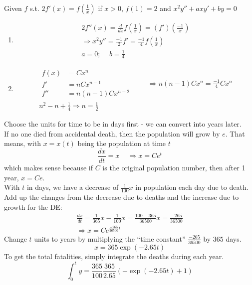 \documentclass[twoside]{amsart}
\theoremstyle{plain}
\theoremstyle{definition}
\newcommand{\exercisehead}[1]
  {\smallskip
   \noindent{\small\bf Exercise #1.}}
\begin{document}
\exercisehead{24} Given $f$ s.t. $2f'(x) = f\left( \frac{1}{x} \right)$ if $x >0$, $f(1) = 2$ and $x^2 y'' + axy' + by = 0$ \\
\begin{enumerate}
\item 
\[
\begin{gathered}
2f''(x) = \frac{d}{dx} f\left( \frac{1}{x} \right) = (f')\left( \frac{-1}{x} \right) \\
\Longrightarrow x^2 y'' = \frac{-1}{2} f' = \frac{-1}{4} f\left( \frac{1}{x} \right) \\
\boxed{ a = 0; \quad \, b = \frac{1}{4} }
\end{gathered}
\]
\item  \[
\begin{gathered}
  \begin{aligned}
    f(x) & = Cx^n \\
    f' & = n C x^{n-1} \\
    f'' & = n(n-1) Cx^{n-2} 
  \end{aligned} \quad \quad \, \Longrightarrow n(n-1)Cx^n = \frac{-1}{4} Cx^n \\
  n^2 - n + \frac{1}{4} \Longrightarrow \boxed{ n = \frac{1}{2} } 
\end{gathered}
\] 
\end{enumerate}

\exercisehead{28} Choose the units for time to be in days first - we can convert into years later.  \medskip \\
If no one died from accidental death, then the population will grow by $e$.  That means, with $x=x(t)$ being the population at time $t$ 
\[
\frac{dx}{dt} = x \quad \, \Longrightarrow x = Ce^t
\]
which makes sense because if $C$ is the original population number, then after 1 year, $x=Ce$.   \\

With $t$ in days, we have a decrease of $\frac{1}{100} x$ in population each day due to death.  Add up the changes from the decrease due to deaths and the increase due to growth for the DE:
\[
\begin{gathered}
\frac{dx}{dt} = \frac{1}{365}x - \frac{1}{100} x = \frac{ 100 - 365}{36500} x = \frac{-265}{36500} \\
\Longrightarrow x = Ce^{ \frac{-265}{36500} t }
\end{gathered}
\]
Change $t$ units to years by multiplying the ``time constant'' $\frac{-265}{36500}$ by $365$ days.
\[
\boxed{ x = 365 \exp{ \left( -2.65 t \right) } }
\]
To get the total fatalities, simply integrate the deaths during each year.  
\[
\int_0^t y = \frac{365}{100} \frac{365}{2.65} \left( -\exp{ (-2.65 t) }  + 1 \right)
\]
\end{document}
